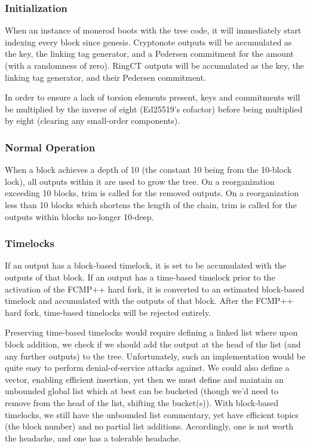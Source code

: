 \documentclass[]{article}
\begin{document}
\subsubsection{Initialization}

When an instance of monerod boots with the tree code, it will immediately start indexing every block since genesis. Cryptonote outputs will be accumulated as the key, the linking tag generator, and a Pedersen commitment for the amount (with a randomness of zero). RingCT outputs will be accumulated as the key, the linking tag generator, and their Pedersen commitment.

In order to ensure a lack of torsion elements present, keys and commitments will be multiplied by the inverse of eight (Ed25519's cofactor) before being multiplied by eight (clearing any small-order components).

\subsubsection{Normal Operation}

When a block achieves a depth of 10 (the constant 10 being from the 10-block lock), all outputs within it are used to grow the tree. On a reorganization exceeding 10 blocks, trim is called for the removed outputs. On a reorganization less than 10 blocks which shortens the length of the chain, trim is called for the outputs within blocks no-longer 10-deep.

\subsubsection{Timelocks}

If an output has a block-based timelock, it is set to be accumulated with the outputs of that block. If an output has a time-based timelock prior to the activation of the FCMP++ hard fork, it is converted to an estimated block-based timelock and accumulated with the outputs of that block. After the FCMP++ hard fork, time-based timelocks will be rejected entirely.

Preserving time-based timelocks would require defining a linked list where upon block addition, we check if we should add the output at the head of the list (and any further outputs) to the tree. Unfortunately, such an implementation would be quite easy to perform denial-of-service attacks against. We could also define a vector, enabling efficient insertion, yet then we must define and maintain an unbounded global list which at best can be bucketed (though we'd need to remove from the head of the list, shifting the bucket(s)). With block-based timelocks, we still have the unbounded list commentary, yet have efficient topics (the block number) and no partial list additions. Accordingly, one is not worth the headache, and one has a tolerable headache.
\end{document}
